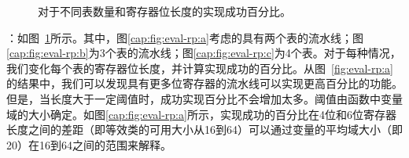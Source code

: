 \documentclass{ctexart}
\newcommand{\para}[1]{\smallskip\noindent {\bf #1}}
\begin{document}
\begin{figure}
  \centering
  \hspace{1in}
  \caption{对于不同表数量和寄存器位长度的实现成功百分比。}
  \label{cap:fig:eval-rp} %
\end{figure}

\para{结果}：如图~\ref{cap:fig:eval-rp}所示。其中，图\ref{cap:fig:eval-rp:a}考虑的具有两个表的流水线；图\ref{cap:fig:eval-rp:b}为3个表的流水线；图\ref{cap:fig:eval-rp:c}为4个表。对于每种情况，我们变化每个表的寄存器位长度，并计算实现成功的百分比。从图~\ref{fig:eval-rp:a}的结果中，我们可以发现具有更多位寄存器的流水线可以实现更高百分比的功能。但是，当长度大于一定阈值时，成功实现百分比不会增加太多。阈值由函数中变量域的大小确定。如图\ref{cap:fig:eval-rp:a}所示，实现成功的百分比在4位和6位寄存器长度之间的差距（即等效类的可用大小从16到64）可以通过变量的平均域大小（即20）在16到64之间的范围来解释。
\end{document}
